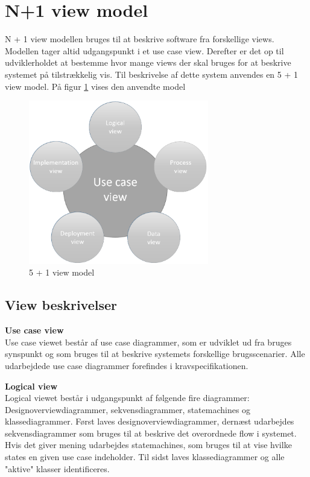 \section{N+1 view model}

N + 1 view modellen bruges til at beskrive software fra forskellige views. Modellen tager altid udgangspunkt i et use case view. Derefter er det op til udviklerholdet at bestemme hvor mange views der skal bruges for at beskrive systemet på tilstrækkelig vis. Til beskrivelse af dette system anvendes en 5 + 1 view model. På figur \ref{fig:5 + 1 view model} vises den anvendte model


\vspace{-5pt}
\begin{figure}[H]
	\centering
	\includegraphics[width=0.7\textwidth]{Billeder/n+1}
	\vspace{0cm}
	\caption{5 + 1 view model}
	\label{fig:5 + 1 view model}
\end{figure}


\newpage

\subsection{View beskrivelser}

\textbf{Use case view}\\
Use case viewet består af use case diagrammer, som er udviklet ud fra bruges synspunkt og som bruges til at beskrive systemets forskellige brugsscenarier. Alle udarbejdede use case diagrammer forefindes i kravspecifikationen.

\textbf{Logical view}\\
Logical viewet består i udgangspunkt af følgende fire diagrammer: Designoverviewdiagrammer, sekvensdiagrammer, statemachines og klassediagrammer. Først laves designoverviewdiagrammer, dernæst udarbejdes sekvensdiagrammer som bruges til at beskrive det overordnede flow i systemet. Hvis det giver mening udarbejdes statemachines, som bruges til at vise hvilke states en given use case indeholder. Til sidst laves klassediagrammer og alle "aktive" klasser identificeres. 

